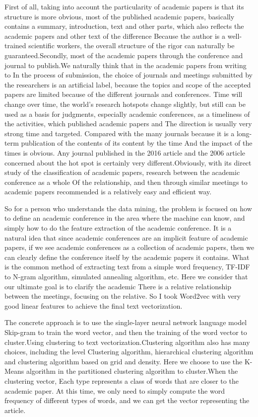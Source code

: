 \begin{bigabstract}
First of all, taking into account the particularity of academic papers is that its structure is more obvious, most of the published academic papers, basically contains a summary, introduction, text and other parts, which also reflects the academic papers and other text of the difference Because the author is a well-trained scientific workers, the overall structure of the rigor can naturally be guaranteed.Secondly, most of the academic papers through the conference and journal to publish.We naturally think that in the academic papers from writing to In the process of submission, the choice of journals and meetings submitted by the researchers is an artificial label, because the topics and scope of the accepted papers are limited because of the different journals and conferences. Time will change over time, the world's research hotspots change slightly, but still can be used as a basis for judgments, especially academic conferences, as a timeliness of the activities, which published academic papers and The direction is usually very strong time and targeted. Compared with the many journals because it is a long-term publication of the contents of its content by the time And the impact of the times is obvious. Any journal published in the 2016 article and the 2006 article concerned about the hot spot is certainly very different.Obviously, with its direct study of the classification of academic papers, research between the academic conference as a whole Of the relationship, and then through similar meetings to academic papers recommended is a relatively easy and efficient way.

So for a person who understands the data mining, the problem is focused on how to define an academic conference in the area where the machine can know, and simply how to do the feature extraction of the academic conference. It is a natural idea that since academic conferences are an implicit feature of academic papers, if we see academic conferences as a collection of academic papers, then we can clearly define the conference itself by the academic papers it contains. What is the common method of extracting text from a simple word frequency, TF-IDF to N-gram algorithm, simulated annealing algorithm, etc. Here we consider that our ultimate goal is to clarify the academic There is a relative relationship between the meetings, focusing on the relative. So I took Word2vec with very good linear features to achieve the final text vectorization.

The concrete approach is to use the single-layer neural network language model Skip-gram to train the word vector, and then the training of the word vector to cluster.Using clustering to text vectorization.Clustering algorithm also has many choices, including the level Clustering algorithm, hierarchical clustering algorithm and clustering algorithm based on grid and density. Here we choose to use the K-Means algorithm in the partitioned clustering algorithm to cluster.When the clustering vector, Each type represents a class of words that are closer to the academic paper. At this time, we only need to simply compute the word frequency of different types of words, and we can get the vector representing the article.


\end{bigabstract}
